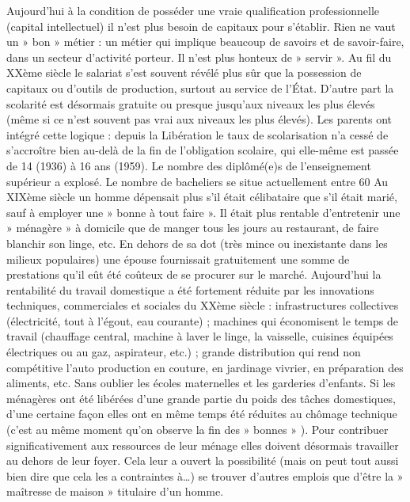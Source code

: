  Aujourd'hui à la condition de posséder une vraie qualification professionnelle (capital intellectuel) il n'est plus besoin de capitaux pour s'établir. Rien ne vaut un » bon » métier : un métier qui implique beaucoup de savoirs et de savoir-faire, dans un secteur d'activité porteur. Il n'est plus honteux de » servir ». Au fil du XXème siècle le salariat s'est souvent révélé plus sûr que la possession de capitaux ou d'outils de production, surtout au service de l'État. D'autre part la scolarité est désormais gratuite ou presque jusqu'aux niveaux les plus élevés (même si ce n'est souvent pas vrai aux niveaux les plus élevés). Les parents ont intégré cette logique : depuis la Libération le taux de scolarisation n'a cessé de s'accroître bien au-delà de la fin de l'obligation scolaire, qui elle-même est passée de 14 (1936) à 16 ans (1959). Le nombre des diplômé(e)s de l'enseignement supérieur a explosé. Le nombre de bacheliers se situe actuellement entre 60 %
 Au XIXème siècle un homme dépensait plus s'il était célibataire que s'il était marié, sauf à employer une » bonne à tout faire ». Il était plus rentable d'entretenir une » ménagère » à domicile que de manger tous les jours au restaurant, de faire blanchir son linge, etc. En dehors de sa dot (très mince ou inexistante dans les milieux populaires) une épouse fournissait gratuitement une somme de prestations qu'il eût été coûteux de se procurer sur le marché. Aujourd'hui la rentabilité du travail domestique a été fortement réduite par les innovations techniques, commerciales et sociales du XXème siècle : infrastructures collectives (électricité, tout à l'égout, eau courante) ; machines qui économisent le temps de travail (chauffage central, machine à laver le linge, la vaisselle, cuisines équipées électriques ou au gaz, aspirateur, etc.) ; grande distribution qui rend non compétitive l'auto production en couture, en jardinage vivrier, en préparation des aliments, etc. Sans oublier les écoles maternelles et les garderies d'enfants. 
 Si les ménagères ont été libérées d'une grande partie du poids des tâches domestiques, d'une certaine façon elles ont en même temps été réduites au chômage technique (c'est au même moment qu'on observe la fin des » bonnes » ). Pour contribuer significativement aux ressources de leur ménage elles doivent désormais travailler au dehors de leur foyer. Cela leur a ouvert la possibilité (mais on peut tout aussi bien dire que cela les a contraintes à…) se trouver d'autres emplois que d'être la » maîtresse de maison » titulaire d'un homme. 
